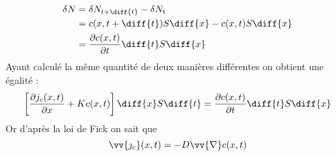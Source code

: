 \documentclass[a4paper,12pt]{article}
\begin{document}
\begin{equation}
	\begin{split}
		\delta N	&= \delta N_{t+\diff{t}} - \delta N_\text{t}\\
					&= c(x,t+\diff{t}) S\diff{x} - c(x,t) S\diff{x}\\
					&= \frac{\partial c(x,t)}{\partial t} \diff{t} S \diff{x}
	\end{split}
\end{equation}
Ayant calculé la même quantité de deux manières différentes on obtient une égalité :
\begin{equation}
	\left[ \frac{\partial j_c (x,t)}{\partial x} + Kc(x,t) \right] \diff{x} S \diff{t} = \frac{\partial c(x,t)}{\partial t} \diff{t} S \diff{x}
\end{equation}
Or d'après la loi de Fick on sait que
\begin{equation}
	\vv{\jmath_c} (x,t) = -D \vv{\nabla} c(x,t)
\end{equation}
\end{document}
